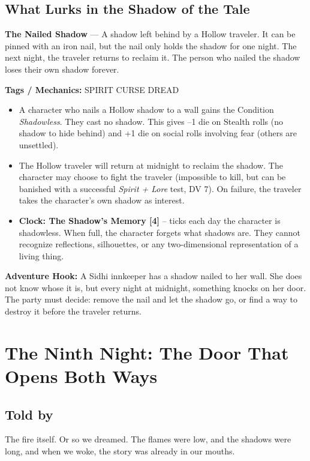 \documentclass[10pt,twoside]{book}
\newcommand{\tag}[1]{\textsc{#1}}
\begin{document}
\section*{What Lurks in the Shadow of the Tale}
\begin{infobox}
\textbf{The Nailed Shadow} --- A shadow left behind by a Hollow traveler. It can be pinned with an iron nail, but the nail only holds the shadow for one night. The next night, the traveler returns to reclaim it. The person who nailed the shadow loses their own shadow forever.

\textbf{Tags / Mechanics:} \tag{SPIRIT} \tag{CURSE} \tag{DREAD}

\begin{itemize}
\item A character who nails a Hollow shadow to a wall gains the Condition \textit{Shadowless}. They cast no shadow. This gives --1 die on Stealth rolls (no shadow to hide behind) and +1 die on social rolls involving fear (others are unsettled).
\item The Hollow traveler will return at midnight to reclaim the shadow. The character may choose to fight the traveler (impossible to kill, but can be banished with a successful \textit{Spirit + Lore} test, DV 7). On failure, the traveler takes the character's own shadow as interest.
\item \textbf{Clock: The Shadow's Memory [4]} -- ticks each day the character is shadowless. When full, the character forgets what shadows are. They cannot recognize reflections, silhouettes, or any two-dimensional representation of a living thing.
\end{itemize}

\textbf{Adventure Hook:} A Sidhi innkeeper has a shadow nailed to her wall. She does not know whose it is, but every night at midnight, something knocks on her door. The party must decide: remove the nail and let the shadow go, or find a way to destroy it before the traveler returns.
\end{infobox}

\chapter{The Ninth Night: The Door That Opens Both Ways}

\section*{Told by}
The fire itself. Or so we dreamed. The flames were low, and the shadows were long, and when we woke, the story was already in our mouths.
\end{document}
